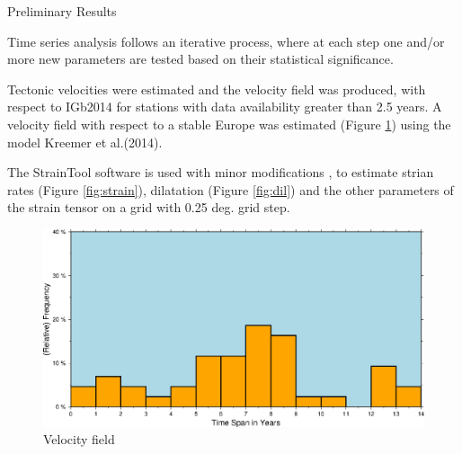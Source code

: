 \documentclass[final,a0,portrait]{beamer}
\newlength{\onecolwid}
\begin{document}
\begin{frame}[t]
\begin{columns}[t]
\begin{column}{\onecolwid}

\begin{block}{Preliminary Results}
{\small
Time series analysis follows an iterative process, where at each step one and/or more new parameters are tested based on their statistical significance.

Tectonic velocities were estimated and the velocity field was produced, with respect to IGb2014 for stations with data availability greater than 2.5 years. A velocity field with respect to a stable Europe was estimated (Figure \ref{fig:crvels}) using the model Kreemer et al.(2014)\cite{kreemer14}.

The StrainTool software is used with minor modifications \cite{straintool}, to estimate strian rates (Figure \ref{fig:strain}), dilatation (Figure \ref{fig:dil}) and the other parameters of the strain tensor on a grid with 0.25 deg. grid step.

\begin{figure}
  \centering
  \includegraphics[width=1\onecolwid]{sample}
  \caption{Velocity field}
  \label{fig:crvels}
\end{figure}

}
\end{block}
\end{column}
\end{columns}
\end{frame}
\end{document}
